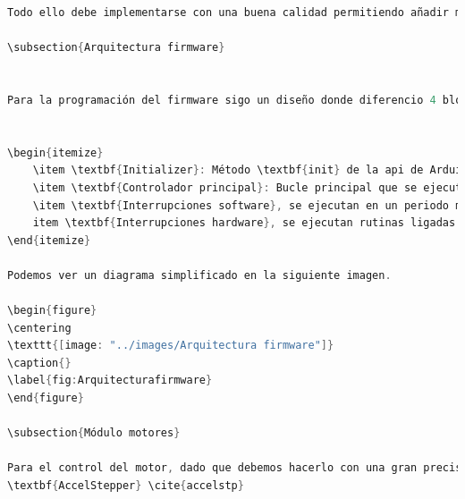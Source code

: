 \begin{lstlisting}[language=cpp, caption={Núcleo implementación firmware  ardufocuser},label={lst:nucleo_firmware_ardufocuser}]
Todo ello debe implementarse con una buena calidad permitiendo añadir más módulos y que se pueda cambiar fácilmente el repertorio de instrucciones de la API.

\subsection{Arquitectura firmware}


Para la programación del firmware sigo un diseño donde diferencio 4 bloques.


\begin{itemize}
	\item \textbf{Initializer}: Método \textbf{init} de la api de Arduino, que se ejecuta en primera instancia, prepara todo el entorno de ejecución, declarando las entradas, salidas,  reservando memoria, iniciar interrupciones, así como ejecutar rutinas como cargar sesión anterior o crear instancias a modo de singleton para manejador los diferentes periféricos. 
	\item \textbf{Controlador principal}: Bucle principal que se ejecuta periódicamente (el periodo no se puede modificar y lo marca la velocidad del reloj del micro), por lo tanto no es adecuado ejecutar rutinas con restricciones temporales fuertes, se corresponde con el método \textbf{loop}, se ocupa de manejar la mayoria de las entradas y salidas.
	\item \textbf{Interrupciones software}, se ejecutan en un periodo marcado por un timer, similar al loop pero con periodos fijo, se usa para rutinas con restricciones temporales fuertes.
	item \textbf{Interrupciones hardware}, se ejecutan rutinas ligadas directamente a eventos de entrada y salida en alguno de los pines habilitados para tal fin. 
\end{itemize}

Podemos ver un diagrama simplificado en la siguiente imagen.

\begin{figure}
\centering
\texttt{[image: "../images/Arquitectura firmware"]}
\caption{}
\label{fig:Arquitecturafirmware}
\end{figure}

\subsection{Módulo motores}

Para el control del motor, dado que debemos hacerlo con una gran precisión, hacemos uso de la libreria 
\textbf{AccelStepper} \cite{accelstp} 


\end{lstlisting}
